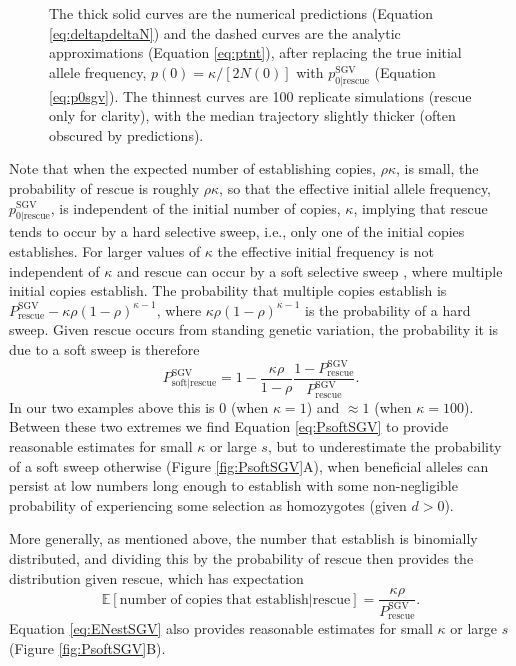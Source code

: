\documentclass[]{article}
\begin{document}
\begin{figure}[htbp]
{The thick solid curves are the numerical predictions (Equation \ref{eq:deltapdeltaN}) and the dashed curves are the analytic approximations (Equation \ref{eq:ptnt}), after replacing the true initial allele frequency, $p(0)=\kappa/[2N(0)]$ with $p_{0|\mathrm{rescue}}^{\mathrm{SGV}}$ (Equation \ref{eq:p0sgv}).
The thinnest curves are 100 replicate simulations (rescue only for clarity), with the median trajectory slightly thicker (often obscured by predictions).
}%
\label{fig:rescueSGV_dynamics}
\end{figure}

Note that when the expected number of establishing copies, $\rho \kappa$, is small, the probability of rescue is roughly $\rho \kappa$, so that the effective initial allele frequency, $p_{0|\mathrm{rescue}}^{\mathrm{SGV}}$, is independent of the initial number of copies, $\kappa$, implying that rescue tends to occur by a hard selective sweep, i.e., only one of the initial copies establishes.
For larger values of $\kappa$ the effective initial frequency is not independent of $\kappa$ and rescue can occur by a soft selective sweep \citep{hermisson2005soft}, where multiple initial copies establish.
The probability that multiple copies establish is $P^\mathrm{SGV}_\mathrm{rescue} - \kappa \rho (1-\rho)^{\kappa-1}$, where $\kappa \rho (1-\rho)^{\kappa-1}$ is the probability of a hard sweep.
Given rescue occurs from standing genetic variation, the probability it is due to a soft sweep is therefore 
\begin{equation}\label{eq:PsoftSGV}
P_{\mathrm{soft}|\mathrm{rescue}}^{\mathrm{SGV}} = 1 - \frac{\kappa \rho}{1-\rho}\frac{1-P_{\mathrm{rescue}}^{\mathrm{SGV}}}{P_{\mathrm{rescue}}^{\mathrm{SGV}}}.
\end{equation}
In our two examples above this is 0 (when $\kappa=1$) and $\approx1$ (when $\kappa=100$).
Between these two extremes we find Equation \ref{eq:PsoftSGV} to provide reasonable estimates for small $\kappa$ or large $s$, but to underestimate the probability of a soft sweep otherwise (Figure \ref{fig:PsoftSGV}A), when beneficial alleles can persist at low numbers long enough to establish with some non-negligible probability of experiencing some selection as homozygotes (given $d>0$).

More generally, as mentioned above, the number that establish is binomially distributed, and dividing this by the probability of rescue then provides the distribution given rescue, which has expectation 
\begin{equation}\label{eq:ENestSGV}
\mathbb{E}[\mathrm{number\; of\; copies\; that\; establish}|\mathrm{rescue}] = \frac{\kappa \rho}{P^\mathrm{SGV}_\mathrm{rescue}}.
\end{equation}
Equation \ref{eq:ENestSGV} also provides reasonable estimates for small $\kappa$ or large $s$ (Figure \ref{fig:PsoftSGV}B).
\end{document}
